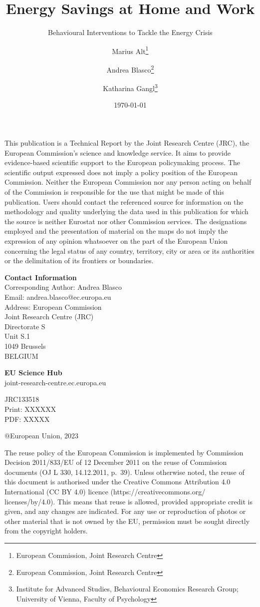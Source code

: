 \documentclass[
  12pt,
  captions=heading]{scrreport}
\title{Energy Savings at Home and Work}
\subtitle{Behavioural Interventions to Tackle the Energy Crisis}
\author{Marius
Alt\thanks{European Commission, Joint Research Centre} \and Andrea
Blasco\thanks{European Commission, Joint Research Centre} \and Katharina
Gangl\thanks{Institute for Advanced Studies, Behavioural Economics Research Group; University of Vienna, Faculty of Psychology}}
\date{\today}
\begin{document}
\maketitle

\newcommand{\smallnotice}{\footnotesize} 
\newcommand{\smallnoticebd}{\footnotesize\textbf}

{
\setcounter{tocdepth}{2}
\tableofcontents
}
\clearpage

\smallnotice This publication is a Technical Report by the Joint
Research Centre (JRC), the European Commission's science and knowledge
service. It aims to provide evidence-based scientific support to the
European policymaking process. The scientific output expressed does not
imply a policy position of the European Commission. Neither the European
Commission nor any person acting on behalf of the Commission is
responsible for the use that might be made of this publication. Users
should contact the referenced source for information on the methodology
and quality underlying the data used in this publication for which the
source is neither Eurostat nor other Commission services. The
designations employed and the presentation of material on the maps do
not imply the expression of any opinion whatsoever on the part of the
European Union concerning the legal status of any country, territory,
city or area or its authorities or the delimitation of its frontiers or
boundaries.

\textbf{Contact Information}\\
Corresponding Author: Andrea Blasco\\
Email: andrea.blasco@ec.europa.eu\\
Address: European Commission\\
Joint Research Centre (JRC)\\
Directorate S\\
Unit S.1\\
1049 Brussels\\
BELGIUM

\textbf{EU Science Hub}\\
joint-research-centre.ec.europa.eu

JRC133518\\
Print: XXXXXX\\
PDF: XXXXX

@European Union, 2023

\smallnotice The reuse policy of the European Commission is implemented
by Commission Decision 2011/833/EU of 12 December 2011 on the reuse of
Commission documents (OJ L 330, 14.12.2011, p.~39). Unless otherwise
noted, the reuse of this document is authorised under the Creative
Commons Attribution 4.0 International (CC BY 4.0) licence
(https://creativecommons.org/ licenses/by/4.0). This means that reuse is
allowed, provided appropriate credit is given, and any changes are
indicated. For any use or reproduction of photos or other material that
is not owned by the EU, permission must be sought directly from the
copyright holders.
\end{document}
